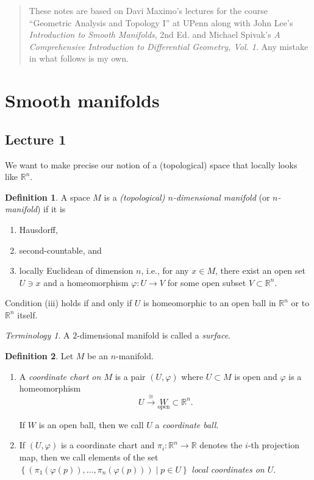 \documentclass[10pt,letterpaper,cm]{nupset}
\theoremstyle{definition}
\newtheorem{definition}{Definition}[subsection]
\theoremstyle{theorem}
\theoremstyle{remark}
\newtheorem*{term}{Terminology}
\newcommand{\R}{\mathbb R}
\newcommand{\1}{\mathbf{1}}
\newcommand{\0}{\vec 0}
\begin{document}
\thispagestyle{empty}
\begin{abstract}
These notes are based on Davi Maximo's lectures for the course ``Geometric Analysis and Topology I'' at UPenn along with John Lee's \textit{Introduction to Smooth Manifolds}, 2nd Ed. and Michael Spivak's \textit{A Comprehensive Introduction to Differential Geometry, Vol. 1}. Any mistake in what follows is my own.
\end{abstract}


\tableofcontents
\newpage

\section{Smooth manifolds}

\subsection{Lecture 1}

We want to make precise our notion of a (topological) space that locally looks like $\R^n$.

\theoremstyle{definition}
\begin{definition}{A space $M$ is a \textit{(topological) $n$-dimensional manifold} (or \textit{$n$-manifold}) if it is 
\begin{enumerate}[label=(\roman*)]
\item Hausdorff, 
\item second-countable, and 
\item locally Euclidean of dimension $n$, i.e., for any $x\in M$, there exist an open set $U\ni x$ and a homeomorphism $\varphi : U \to V$ for some open subset $V\subset \R^n$.
\end{enumerate}
}
\end{definition}

Condition (iii) holds if and only if $U$ is homeomorphic to an open ball in $\R^n$ or to $\R^n$ itself.

\smallskip

\begin{term}
A $2$-dimensional manifold is called a \textit{surface}.
\end{term}

\begin{definition} Let $M$ be an $n$-manifold.
\begin{enumerate}
\item  A \textit{coordinate chart on $M$} is a pair $\left(U, \varphi\right)$ where $U\subset M$ is open and $\varphi$ is a homeomorphism $$U \overset{\cong}{\longrightarrow} \underset{\text{open}} W \subset \R^n.$$

If $W$ is an open ball, then we call $U$ a \textit{coordinate ball}.
\item If $\left(U, \varphi\right)$ is a coordinate chart and $\pi_i : \R^n \to \R$ denotes the $i$-th projection map, then we call elements of the set $\left\{\left(\pi_1(\varphi(p)), \ldots, \pi_n(\varphi(p))\right) \mid p \in U\right\}$ \textit{local coordinates on $U$}.
\end{enumerate}
\end{definition}
\end{document}
